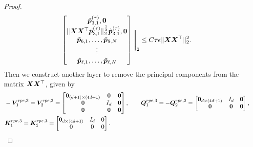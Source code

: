 \begin{proof}
\begin{align*}
\begin{bmatrix}
            \tilde{\boldsymbol{p}}_{3,1}^{(\tau)},\boldsymbol{0}\\
            \Vert\boldsymbol{X}\boldsymbol{X}^\top\tilde{\boldsymbol{p}}_{3,1}^{(\tau)}\Vert_2^{\frac{1}{2}}\tilde{\boldsymbol{p}}_{3,1}^{(\tau)},\boldsymbol{0}\\
            \tilde{\boldsymbol{p}}_{6,1},\ldots,\tilde{\boldsymbol{p}}_{6,N}\\
            \vdots\\
            \tilde{\boldsymbol{p}}_{\ell,1},\ldots,\tilde{\boldsymbol{p}}_{\ell,N}
        \end{bmatrix} \Bigg\Vert_2\leq C\tau\epsilon\Vert\boldsymbol{X}\boldsymbol{X}^\top\Vert_2^2.
    \end{align*}
    Then we construct another layer to remove the principal components from the matrix $\boldsymbol{X}\boldsymbol{X}^\top$, given by
    \begin{align*}
        &-\boldsymbol{V}_1^{rpe,3}=\boldsymbol{V}_2^{rpe,3}= \begin{bmatrix}
            \boldsymbol{0}_{(d+1)\times(4d+1)}&\boldsymbol{0}&\boldsymbol{0}\\
            \boldsymbol{0}& I_d&\boldsymbol{0}\\
            \boldsymbol{0}&\boldsymbol{0}&\boldsymbol{0}
        \end{bmatrix},\qquad\boldsymbol{Q}_1^{rpe,3}=-\boldsymbol{Q}_2^{rpe,3}=\begin{bmatrix}
            \boldsymbol{0}_{d\times(4d+1)}&I_d&\boldsymbol{0}\\
            \boldsymbol{0}&\boldsymbol{0}&\boldsymbol{0}
        \end{bmatrix},\\
        &\boldsymbol{K}_1^{rpe,3}=\boldsymbol{K}_2^{rpe,3}=\begin{bmatrix}
            \boldsymbol{0}_{d\times(4d+1)}& I_d&\boldsymbol{0}\\
            \boldsymbol{0}&\boldsymbol{0}&\boldsymbol{0}
        \end{bmatrix}.
    \end{align*}

\end{proof}
